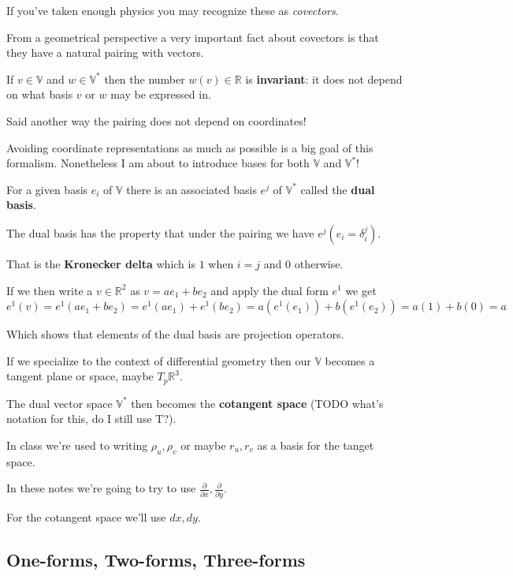 \documentclass{article}
\begin{document}
If you've taken enough physics you may recognize these as \textit{covectors}.

From a geometrical perspective a very important fact about covectors is that
they have a natural pairing with vectors.

If $v \in \mathbb{V}$ and $w \in \mathbb{V}^{*}$ then the number $w(v) \in
\mathbb{R}$ is \textbf{invariant}: it does not depend on what basis $v$ or $w$
may be expressed in.

Said another way the pairing does not depend on coordinates!

Avoiding coordinate representations as much as possible is a big goal of this
formalism. Nonetheless I am about to introduce bases for both $\mathbb{V}$ and $\mathbb{V}^{*}$!

For a given basis $e_{i}$ of $\mathbb{V}$ there is an associated basis $e^{j}$
of $\mathbb{V}^{*}$ called the \textbf{dual basis}.

The dual basis has the property that under the pairing we have $e^{j}(e_{i} = \delta^{j}_{i})$.

That is the \textbf{Kronecker delta} which is $1$ when $i = j$ and $0$
otherwise.

If we then write a $v \in \mathbb{R}^{2}$ as $v = ae_{1} + be_{2}$ and apply the
dual form $e^{1}$ we get $e^{1} (v) = e^{1}(ae_{1} + be_{2}) = e^{1}(ae_{1}) +
  e^{1}(be_{2}) = a(e^{1}(e_{1})) + b(e^{1}(e_{2})) = a(1) + b(0) = a$

Which shows that elements of the dual basis are projection operators.

If we specialize to the context of differential geometry then our $\mathbb{V}$
becomes a tangent plane or space, maybe $T_{p}\mathbb{R}^{3}$.

The dual vector space $\mathbb{V}^{*}$ then becomes the \textbf{cotangent space}
(TODO what's notation for this, do I still use T?).

In class we're used to writing $\rho_{u}, \rho_{v}$ or maybe $r_{u}, r_{v}$ as a
basis for the tanget space.

In these notes we're going to try to use $\frac{\partial}{\partial x}, \frac{\partial}{\partial
  y}$.

For the cotangent space we'll use $dx, dy$.

\subsection{One-forms, Two-forms, Three-forms}
\end{document}
